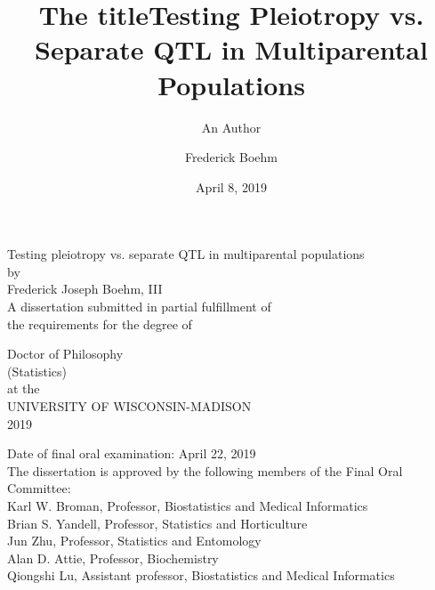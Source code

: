 \documentclass[oneside]{book}\usepackage[]{graphicx}\usepackage[]{color}
\title{The title}
\author{An Author}
\title{Testing Pleiotropy vs. Separate QTL in Multiparental Populations}
\author{Frederick Boehm}
\date{April 8, 2019}
\begin{document}
\frontmatter %




\doublespacing
\begin{titlepage}\thispagestyle{empty}
\begin{center}
 {\Large%
Testing pleiotropy vs. separate QTL in multiparental populations}\\
 \vspace{1cm}
 by \\
 \vspace{0.5cm}
 {\Large Frederick Joseph Boehm, III}\\[5pt]
 \vspace{1cm}
{A dissertation submitted in partial fulfillment of} \\[5pt]
{the requirements for the degree of}\\
\vspace{1cm}

\Large{{Doctor of Philosophy}}
\\[5pt]
{(Statistics)}\\
at the \\
UNIVERSITY OF WISCONSIN-MADISON\\
2019 \\
\end{center}

\vspace{1.5cm}

Date of final oral examination:  April 22, 2019\\

The dissertation is approved by the following members of the Final Oral Committee:\\
\indent \indent Karl W. Broman, Professor, Biostatistics and Medical Informatics\\
\indent \indent  Brian S. Yandell, Professor, Statistics and Horticulture\\
\indent \indent  Jun Zhu, Professor, Statistics and Entomology\\
\indent \indent Alan D. Attie, Professor, Biochemistry\\
\indent \indent Qiongshi Lu, Assistant professor, Biostatistics and Medical Informatics




 \vfill
\end{titlepage}
\setcounter{page}{1} %
\end{document}
